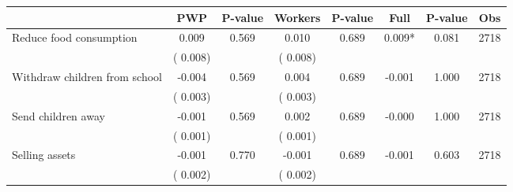 
\begin{tabular}{l*{7}{c}}\hline&\multicolumn{1}{c}{PWP}&\multicolumn{1}{c}{P-value}&\multicolumn{1}{c}{Workers}&\multicolumn{1}{c}{P-value}&\multicolumn{1}{c}{Full}&\multicolumn{1}{c}{P-value}&\multicolumn{1}{c}{Obs} \\ \hline

 Reduce food consumption       &              0.009       &        0.569  &              0.010       &        0.689  &              0.009*       &              0.081 &  2718 \\ 
                       &       (       0.008)             &                               &       (       0.008)                     &                               &                                               &                                &                      \\ 

 Withdraw children from school       &             -0.004       &        0.569  &              0.004       &        0.689  &             -0.001       &              1.000 &  2718 \\ 
                       &       (       0.003)             &                               &       (       0.003)                     &                               &                                               &                                &                      \\ 

 Send children away       &             -0.001       &        0.569  &              0.002       &        0.689  &             -0.000       &              1.000 &  2718 \\ 
                       &       (       0.001)             &                               &       (       0.001)                     &                               &                                               &                                &                      \\ 

 Selling assets       &             -0.001       &        0.770  &             -0.001       &        0.689  &             -0.001       &              0.603 &  2718 \\ 
                       &       (       0.002)             &                               &       (       0.002)                     &                               &                                               &                                &                      \\ 


\end{tabular}
